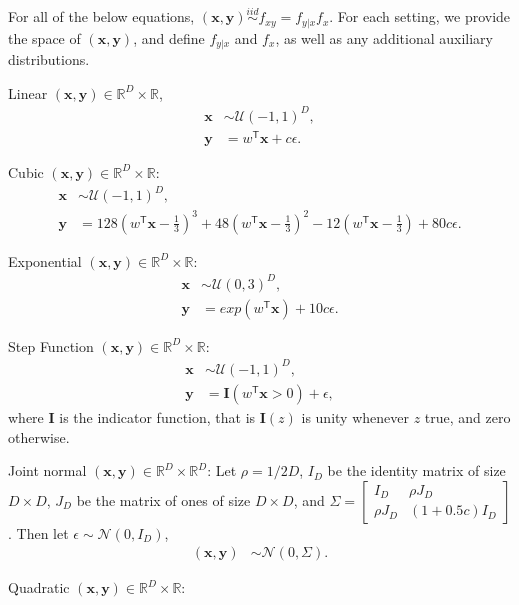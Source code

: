 \documentclass[11pt]{article}
\providecommand{\mb}[1]{\boldsymbol{#1}}
\providecommand{\mc}[1]{\mathcal{#1}}
\newcommand{\Real}{\mathbb{R}}
\newcommand{\T}{^{\ensuremath{\mathsf{T}}}}           %
\begin{document}
For all of the below equations, $(\mb{x},\mb{y}) \overset{iid}{\sim} f_{xy} = f_{y|x} f_x$. For each setting, we provide the space of $(\mb{x},\mb{y})$, and define $f_{y|x}$ and $f_x$, as well as any additional auxiliary distributions.

\setcounter{equation}{0}
\begin{compactenum}
\item Linear $(\mb{x},\mb{y}) \in \Real^{D} \times \Real$,
\begin{align*}
\mb{x} &\sim \mc{U}(-1,1)^{D},\\
\mb{y} &=w\T \mb{x}+c\epsilon.
\end{align*}
\item Cubic $(\mb{x},\mb{y}) \in \Real^{D} \times \Real$:
\begin{align*}
\mb{x} &\sim \mc{U}(-1,1)^{D}, \\
\mb{y} &=128(w\T \mb{x}-\tfrac{1}{3})^3+48(w\T \mb{x}-\tfrac{1}{3})^2-12(w\T \mb{x}-\tfrac{1}{3})+80c\epsilon.
\end{align*}
\item Exponential $(\mb{x},\mb{y}) \in \Real^{D} \times \Real$:
\begin{align*}
\mb{x} &\sim \mc{U}(0,3)^{D}, \\
\mb{y} &=exp(w\T \mb{x})+10c\epsilon.
\end{align*}
\item Step Function $(\mb{x},\mb{y}) \in \Real^{D} \times \Real$:
\begin{align*}
\mb{x} &\sim \mc{U}(-1,1)^{D},\\
\mb{y} &=\mb{I}(w\T \mb{x}>0)+\epsilon,
\end{align*}
where $\mb{I}$ is the indicator function, that is $\mb{I}(z)$ is unity whenever $z$ true, and zero otherwise.
\item Joint normal $(\mb{x},\mb{y}) \in \Real^{D} \times \Real^{D}$: Let $\rho=1/2D$, $I_{D}$ be the identity matrix of size $D \times D$, $J_{D}$ be the matrix of ones of size $D \times D$, and $\Sigma = \begin{bmatrix} I_{D}&\rho J_{D}\\ \rho J_{D}& (1+0.5c) I_{D} \end{bmatrix}$. Then let $\epsilon \sim \mc{N}(0, I_{D})$,
\begin{align*}
(\mb{x}, \mb{y}) &\sim \mc{N}(0, \Sigma). 
\end{align*}
\item Quadratic $(\mb{x},\mb{y}) \in \Real^{D} \times \Real$:

\end{compactenum}
\end{document}
